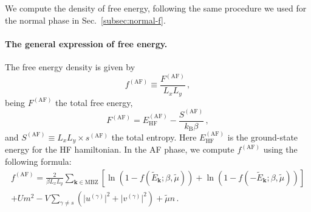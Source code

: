 We compute the density of free energy, following the same procedure we used for the normal phase in Sec.~\ref{subsec:normal-f}. 

\paragraph{The general expression of free energy.}

The free energy density is given by
\begin{equation}\label{eq:af-fMFT-def}
	f^{(\mathrm{AF})} \equiv \frac{F^{(\mathrm{AF})}}{L_x L_y} \, ,
\end{equation}
being $F^{(\mathrm{AF})}$ the total free energy,
\begin{equation}\label{eq:af-FMFT-def}
	F^{(\mathrm{AF})} = E_\mathrm{HF}^{(\mathrm{AF})} - \frac{S^{(\mathrm{AF})}}{k_\mathrm{B} \beta} \, ,
\end{equation}
and $S^{(\mathrm{AF})} \equiv  L_x L_y \times s^{(\mathrm{AF})}$ the total entropy. Here $E_\mathrm{HF}^{(\mathrm{AF})}$ is the ground-state energy for the HF hamiltonian. In the AF phase, we compute $f^{(\mathrm{AF})}$ using the following formula:
\begin{multline}
	f^{(\mathrm{AF})} = \frac{2}{\beta L_x L_y} \sum_{\mathbf{k}\in\mathrm{MBZ}} \left[
	\ln \left(
	1- f( \tilde{E}_\mathbf{k}; \beta,\tilde{\mu}) 
	\right) + \ln \left(
	1- f( -\tilde{E}_\mathbf{k}; \beta,\tilde{\mu}) 
	\right)
	\right] \\
	+ U m^2 - V \sum_{\gamma \neq s} \left(	\big|u^{(\gamma)}\big|^2 + \big|v^{(\gamma)}\big|^2
	\right) + \tilde{\mu} n \, .
	\label{eq:af-fMFT}
\end{multline}

